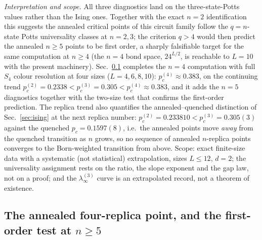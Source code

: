 \documentclass[aps,prx,reprint,superscriptaddress,nobibnotes,longbibliography]{revtex4-2}
\theoremstyle{remark}
\begin{document}
\emph{Interpretation and scope.}  All three diagnostics land on the three-state-Potts values rather than the Ising ones.  Together with the exact $n=2$ identification this suggests the annealed critical points of this circuit family follow the $q=n$-state Potts universality classes at $n=2,3$; the criterion $q>4$ would then predict the annealed $n\ge5$ points to be first order, a sharply falsifiable target for the same computation at $n\ge4$ (the $n=4$ bond space, $24^{L/2}$, is reachable to $L=10$ with the present machinery).  Sec.~\ref{sec:n4n5} completes the $n=4$ computation with full $S_4$ colour resolution at four sizes ($L=4,6,8,10$): $p_c^{(4)}\approx0.383$, on the continuing trend $p_c^{(2)}=0.2338<p_c^{(3)}=0.305<p_c^{(4)}\approx0.383$, and it adds the $n=5$ diagnostics together with the two-size test that confirms the first-order prediction.  The replica trend also quantifies the annealed--quenched distinction of Sec.~\ref{sec:ising} at the next replica number: $p_c^{(2)}=0.233810<p_c^{(3)}=0.305(3)$ against the quenched $p_c=0.1597(8)$, i.e.\ the annealed points move \emph{away} from the quenched transition as $n$ grows, so no sequence of annealed $n$-replica points converges to the Born-weighted transition from above.  Scope: exact finite-size data with a systematic (not statistical) extrapolation, sizes $L\le12$, $d=2$; the universality assignment rests on the ratio, the slope exponent and the gap law, not on a proof; and the $\lambda_\infty^{(3)}$ curve is an extrapolated record, not a theorem of existence.

\subsection{The annealed four-replica point, and the first-order test at $n\ge5$}
\label{sec:n4n5}
\end{document}
